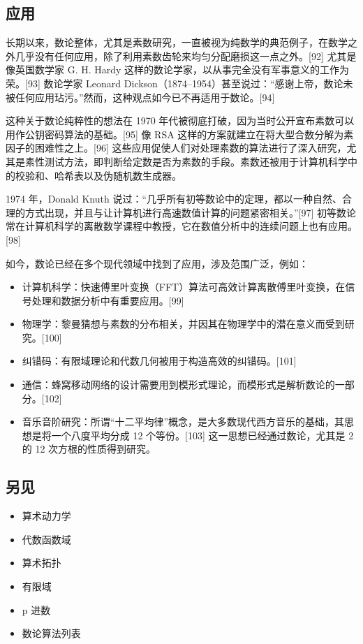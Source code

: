 \subsection{应用}
长期以来，数论整体，尤其是素数研究，一直被视为纯数学的典范例子，在数学之外几乎没有任何应用，除了利用素数齿轮来均匀分配磨损这一点之外。[92] 尤其是像英国数学家 G. H. Hardy 这样的数论学家，以从事完全没有军事意义的工作为荣。[93] 数论学家 Leonard Dickson（1874–1954）甚至说过：“感谢上帝，数论未被任何应用玷污。”然而，这种观点如今已不再适用于数论。[94]

这种关于数论纯粹性的想法在 1970 年代被彻底打破，因为当时公开宣布素数可以用作公钥密码算法的基础。[95] 像 RSA 这样的方案就建立在将大型合数分解为素因子的困难性之上。[96] 这些应用促使人们对处理素数的算法进行了深入研究，尤其是素性测试方法，即判断给定数是否为素数的手段。素数还被用于计算机科学中的校验和、哈希表以及伪随机数生成器。

1974 年，Donald Knuth 说过：“几乎所有初等数论中的定理，都以一种自然、合理的方式出现，并且与让计算机进行高速数值计算的问题紧密相关。”[97] 初等数论常在计算机科学的离散数学课程中教授，它在数值分析中的连续问题上也有应用。[98]

如今，数论已经在多个现代领域中找到了应用，涉及范围广泛，例如：
\begin{itemize}
\item 计算机科学：快速傅里叶变换（FFT）算法可高效计算离散傅里叶变换，在信号处理和数据分析中有重要应用。[99]
\item 物理学：黎曼猜想与素数的分布相关，并因其在物理学中的潜在意义而受到研究。[100]
\item 纠错码：有限域理论和代数几何被用于构造高效的纠错码。[101]
\item 通信：蜂窝移动网络的设计需要用到模形式理论，而模形式是解析数论的一部分。[102]
\item 音乐音阶研究：所谓“十二平均律”概念，是大多数现代西方音乐的基础，其思想是将一个八度平均分成 12 个等份。[103] 这一思想已经通过数论，尤其是 2 的 12 次方根的性质得到研究。
\end{itemize}
\subsection{另见}
\begin{itemize}
\item 算术动力学
\item 代数函数域
\item 算术拓扑
\item 有限域
\item p 进数
\item 数论算法列表
\end{itemize}
